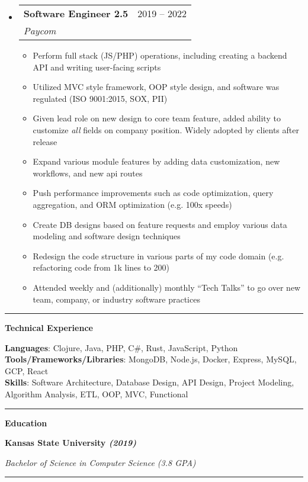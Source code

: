 \documentclass[letterpaper,11pt]{article}
\makeatletter
\newcommand{\resumeItem}[1]{
  \item\small{
    {#1 \vspace{-2pt}}
  }
}
\newcommand{\resumeSubheading}[4]{
  \vspace{-2pt}\item
    \begin{tabular*}{0.97\textwidth}[t]{l@{\extracolsep{\fill}}r}
      \textbf{#1} & #2 \\
      \textit{\small#3} & \textit{\small #4} \\
    \end{tabular*}\vspace{0pt}
}
\newcommand{\resumeSubHeadingListStart}{\begin{itemize}[leftmargin=0.15cm, label={}]}
\newcommand{\resumeSubHeadingListEnd}{\end{itemize}}
\newcommand{\resumeItemListStart}{\begin{itemize}}
\newcommand{\resumeItemListEnd}{\end{itemize}\vspace{-5pt}}
\makeatother
\begin{document}
\resumeSubHeadingListStart
    \resumeSubheading
      {Software Engineer 2.5}{2019 – 2022}
      {Paycom}{}
      \resumeItemListStart
          \resumeItem{
          Perform full stack (JS/PHP) operations, including creating a backend API and writing user-facing scripts}
          \resumeItem{
          Utilized MVC style framework, OOP style design, and software was regulated (ISO 9001:2015, SOX, PII)}
          \resumeItem{ Given lead role on new design to core team feature, added ability to customize \textit{all} fields on company position. Widely adopted by clients after release }
          \resumeItem{
          Expand various module features by adding data customization, new workflows, and new api routes}
          \resumeItem{Push performance improvements such as code optimization, query aggregation, and ORM optimization (e.g. 100x speeds)}
          \resumeItem{
          Create DB designs based on feature requests and employ various data modeling and software design techniques}
          \resumeItem{
        Redesign the code structure in various parts of my code domain (e.g. refactoring code from 1k lines to 200)}
          \resumeItem{
          Attended weekly and (additionally) monthly “Tech Talks” to go over new team, company, or industry software practices}
      \resumeItemListEnd
\resumeSubHeadingListEnd
\noindent\rule{19.5cm}{0.4pt}

%
\textbf{\large \textcolor{magic_blue}{Technical Experience} }

\textbf{ Languages}{: Clojure, Java, PHP, C\#, Rust, JavaScript, Python } \\

\textbf{ Tools/Frameworks/Libraries}{: MongoDB, Node.js, Docker, Express, MySQL, GCP, React } \\

\textbf{ Skills}{: }
Software Architecture, Database Design, API Design, Project Modeling, Algorithm Analysis, ETL, OOP, MVC, Functional

\noindent\rule{19.5cm}{0.4pt}

\textbf{\large \textcolor{magic_blue}{Education}}

\begin{minipage}[t]{0.45\textwidth}
    \raggedright
    \textbf{ Kansas State University \textit{(2019)}} \\
\end{minipage}
\hfill
\begin{minipage}[t]{0.45\textwidth}
    \raggedleft
    \textit{Bachelor of Science in Computer Science (3.8 GPA)} \\
\end{minipage}
\noindent\rule{19.5cm}{0.4pt}
\end{document}
